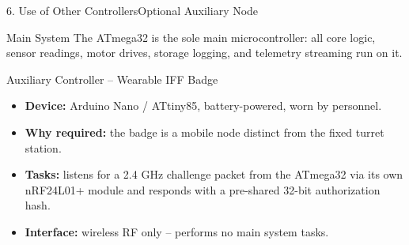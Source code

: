 \documentclass[aspectratio=169, 10pt]{beamer}
\begin{document}
\begin{frame}{6. Use of Other Controllers}{Optional Auxiliary Node}
    \begin{block}{Main System}
        \small The ATmega32 is the sole main microcontroller: all core logic, sensor readings, motor drives, storage logging, and telemetry streaming run on it.
    \end{block}
    \begin{block}{Auxiliary Controller -- Wearable IFF Badge}
        \small
        \begin{itemize}
            \item \textbf{Device:} Arduino Nano / ATtiny85, battery-powered, worn by personnel.
            \item \textbf{Why required:} the badge is a mobile node distinct from the fixed turret station.
            \item \textbf{Tasks:} listens for a 2.4 GHz challenge packet from the ATmega32 via its own nRF24L01+ module and responds with a pre-shared 32-bit authorization hash.
            \item \textbf{Interface:} wireless RF only -- performs no main system tasks.
        \end{itemize}
    \end{block}
\end{frame}
\end{document}
